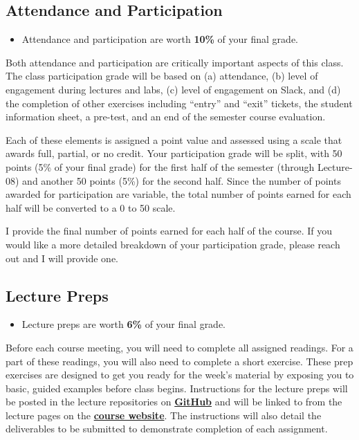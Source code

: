 \documentclass[]{book}
\newenvironment{rmdblock}[1]
  {\begin{shaded*}
  \begin{itemize}
  \renewcommand{\labelitemi}{
    \raisebox{-.7\height}[0pt][0pt]{
      {\setkeys{Gin}{width=3em,keepaspectratio}\texttt{[image: images/\#1]}}
    }
  }
  \item
  }
  {
  \end{itemize}
  \end{shaded*}
  }
\newenvironment{rmdtip}
  {\begin{rmdblock}{tip}}
  {\end{rmdblock}}
\theoremstyle{definition}
\theoremstyle{definition}
\theoremstyle{definition}
\theoremstyle{remark}
\begin{document}
\hypertarget{attendance-and-participation-1}{%
\subsection{Attendance and
Participation}\label{attendance-and-participation-1}}

\begin{rmdtip}
Attendance and participation are worth \textbf{10\%} of your final
grade.
\end{rmdtip}

Both attendance and participation are critically important aspects of
this class. The class participation grade will be based on (a)
attendance, (b) level of engagement during lectures and labs, (c) level
of engagement on Slack, and (d) the completion of other exercises
including ``entry'' and ``exit'' tickets, the student information sheet,
a pre-test, and an end of the semester course evaluation.

Each of these elements is assigned a point value and assessed using a
scale that awards full, partial, or no credit. Your participation grade
will be split, with 50 points (5\% of your final grade) for the first
half of the semester (through Lecture-08) and another 50 points (5\%)
for the second half. Since the number of points awarded for
participation are variable, the total number of points earned for each
half will be converted to a 0 to 50 scale.

I provide the final number of points earned for each half of the course.
If you would like a more detailed breakdown of your participation grade,
please reach out and I will provide one.

\hypertarget{lecture-preps}{%
\subsection{Lecture Preps}\label{lecture-preps}}

\begin{rmdtip}
Lecture preps are worth \textbf{6\%} of your final grade.
\end{rmdtip}

Before each course meeting, you will need to complete all assigned
readings. For a part of these readings, you will also need to complete a
short exercise. These prep exercises are designed to get you ready for
the week's material by exposing you to basic, guided examples before
class begins. Instructions for the lecture preps will be posted in the
lecture repositories on
\href{https://github.com/slu-soc5050}{\textbf{GitHub}} and will be
linked to from the lecture pages on the
\href{https://slu-soc5050.github.io/}{\textbf{course website}}. The
instructions will also detail the deliverables to be submitted to
demonstrate completion of each assignment.
\end{document}
